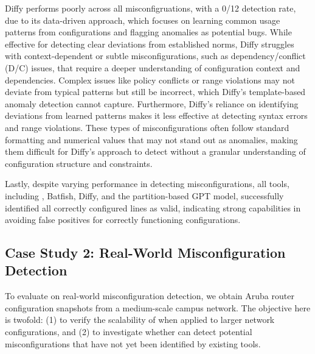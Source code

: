 Diffy performs poorly across all misconfigruations, with a 0/12 detection rate, due to its data-driven approach, which focuses on learning common usage patterns from configurations and flagging anomalies as potential bugs. While effective for detecting clear deviations from established norms, Diffy struggles with context-dependent or subtle misconfigurations, such as dependency/conflict (D/C) issues, that require a deeper understanding of configuration context and dependencies. Complex issues like policy conflicts or range violations may not deviate from typical patterns but still be incorrect, which Diffy’s template-based anomaly detection cannot capture. Furthermore, Diffy's reliance on identifying deviations from learned patterns makes it less effective at detecting syntax errors and range violations. These types of misconfigurations often follow standard formatting and numerical values that may not stand out as anomalies, making them difficult for Diffy's approach to detect without a granular understanding of configuration structure and constraints.

Lastly, despite varying performance in detecting misconfigurations, all tools, including \sysname{}, Batfish, Diffy, and the partition-based GPT model, successfully identified all correctly configured lines as valid, indicating strong capabilities in avoiding false positives for correctly functioning configurations. 

\subsection{Case Study 2: Real-World Misconfiguration Detection}
To evaluate \sysname{} on real-world misconfiguration detection, we obtain Aruba router configuration snapshots from a medium-scale campus network. The objective here is twofold: (1) to verify the scalability of \sysname{} when applied to larger network configurations, and (2) to investigate whether \sysname{} can detect potential misconfigurations that have not yet been identified by existing tools.


